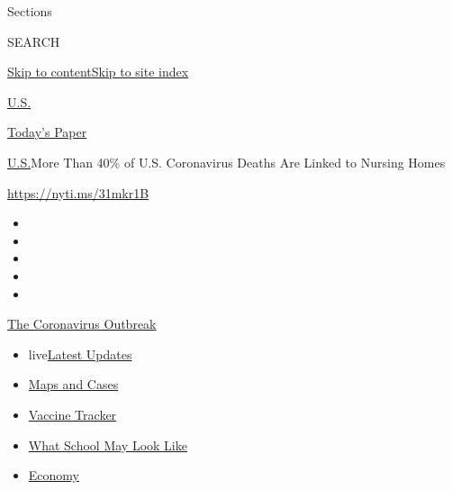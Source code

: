 Sections

SEARCH

\protect\hyperlink{site-content}{Skip to
content}\protect\hyperlink{site-index}{Skip to site index}

\href{https://www.nytimes.com/section/us}{U.S.}

\href{https://myaccount.nytimes.com/auth/login?response_type=cookie\&client_id=vi}{}

\href{https://www.nytimes.com/section/todayspaper}{Today's Paper}

\href{/section/us}{U.S.}\textbar{}More Than 40\% of U.S. Coronavirus
Deaths Are Linked to Nursing Homes

\url{https://nyti.ms/31mkr1B}

\begin{itemize}
\item
\item
\item
\item
\item
\end{itemize}

\href{https://www.nytimes.com/news-event/coronavirus?action=click\&pgtype=Article\&state=default\&region=TOP_BANNER\&context=storylines_menu}{The
Coronavirus Outbreak}

\begin{itemize}
\tightlist
\item
  live\href{https://www.nytimes.com/2020/08/02/world/coronavirus-updates.html?action=click\&pgtype=Article\&state=default\&region=TOP_BANNER\&context=storylines_menu}{Latest
  Updates}
\item
  \href{https://www.nytimes.com/interactive/2020/us/coronavirus-us-cases.html?action=click\&pgtype=Article\&state=default\&region=TOP_BANNER\&context=storylines_menu}{Maps
  and Cases}
\item
  \href{https://www.nytimes.com/interactive/2020/science/coronavirus-vaccine-tracker.html?action=click\&pgtype=Article\&state=default\&region=TOP_BANNER\&context=storylines_menu}{Vaccine
  Tracker}
\item
  \href{https://www.nytimes.com/interactive/2020/07/29/us/schools-reopening-coronavirus.html?action=click\&pgtype=Article\&state=default\&region=TOP_BANNER\&context=storylines_menu}{What
  School May Look Like}
\item
  \href{https://www.nytimes.com/live/2020/07/31/business/stock-market-today-coronavirus?action=click\&pgtype=Article\&state=default\&region=TOP_BANNER\&context=storylines_menu}{Economy}
\end{itemize}

